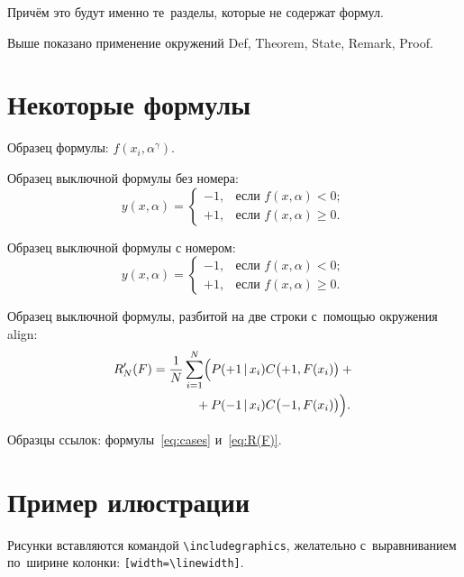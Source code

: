 \documentclass[12pt,twoside]{article}
\begin{document}
\begin{Proof}
    Причём это будут именно те~разделы, которые не содержат формул.
\end{Proof}

\begin{Remark}
    Выше показано применение окружений
    Def, Theorem, State, Remark, Proof.
\end{Remark}

\section{Некоторые формулы}

Образец формулы: $f(x_i,\alpha^\gamma)$.

Образец выключной формулы без номера:
\[
    y(x,\alpha) =
    \begin{cases}
        -1, & \text{если } f(x,\alpha)<0;  \\
        +1, & \text{если } f(x,\alpha)\geq 0.
    \end{cases}
\]

Образец выключной формулы с номером:
\begin{equation}
\label{eq:cases}
    y(x,\alpha) =
    \begin{cases}
        -1, & \text{если } f(x,\alpha)<0;  \\
        +1, & \text{если } f(x,\alpha)\geq 0.
    \end{cases}
\end{equation}

Образец выключной формулы, разбитой на две строки с~помощью окружения align:
\begin{align}
    R'_N(F)
        = \frac1N \sum_{i=1}^N
        \Bigl(
            & P(+1\cond x_i) C\bigl(+1,F(x_i)\bigr)+{}
        \notag %
    \\ {}+{}
            & P(-1\cond x_i) C\bigl(-1,F(x_i)\bigr)
        \Bigr).
        \label{eq:R(F)}
\end{align}

Образцы ссылок: формулы~\eqref{eq:cases} и~\eqref{eq:R(F)}.

\section{Пример илюстрации}

Рисунки вставляются командой \verb|\includegraphics|,
желательно с~выравниванием по~ширине колонки: \verb|[width=\linewidth]|.
\end{document}
